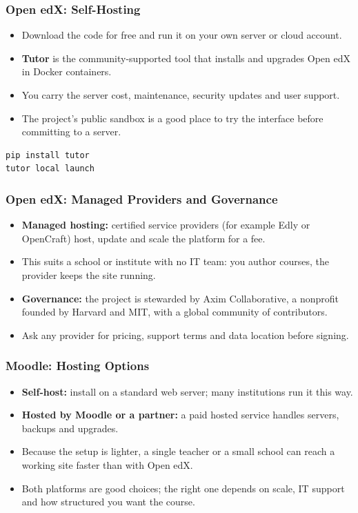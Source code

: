 \begin{frame}[fragile]\frametitle{Open edX: Self-Hosting}
\begin{itemize}
\item Download the code for free and run it on your own server or cloud account.
\item \textbf{Tutor} is the community-supported tool that installs and upgrades Open edX in Docker containers.
\item You carry the server cost, maintenance, security updates and user support.
\item The project's public sandbox is a good place to try the interface before committing to a server.
\end{itemize}
\begin{lstlisting}[language=HTML]
pip install tutor
tutor local launch
\end{lstlisting}
\end{frame}

\begin{frame}[fragile]\frametitle{Open edX: Managed Providers and Governance}
\begin{itemize}
\item \textbf{Managed hosting:} certified service providers (for example Edly or OpenCraft) host, update and scale the platform for a fee.
\item This suits a school or institute with no IT team: you author courses, the provider keeps the site running.
\item \textbf{Governance:} the project is stewarded by Axim Collaborative, a nonprofit founded by Harvard and MIT, with a global community of contributors.
\item Ask any provider for pricing, support terms and data location before signing.
\end{itemize}
\end{frame}

\begin{frame}[fragile]\frametitle{Moodle: Hosting Options}
\begin{itemize}
\item \textbf{Self-host:} install on a standard web server; many institutions run it this way.
\item \textbf{Hosted by Moodle or a partner:} a paid hosted service handles servers, backups and upgrades.
\item Because the setup is lighter, a single teacher or a small school can reach a working site faster than with Open edX.
\item Both platforms are good choices; the right one depends on scale, IT support and how structured you want the course.
\end{itemize}
\end{frame}

